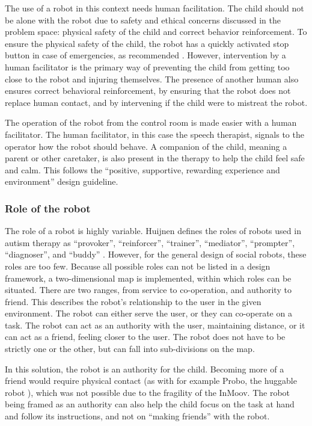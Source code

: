 The use of a robot in this context needs human facilitation. The child should not be alone with the robot due to safety and ethical concerns discussed in the problem space: physical safety of the child and correct behavior reinforcement. To ensure the physical safety of the child, the robot has a quickly activated stop button in case of emergencies, as recommended \cite{giullian2010detailed}. However, intervention by a human facilitator is the primary way of preventing the child from getting too close to the robot and injuring themselves. The presence of another human also ensures correct behavioral reinforcement, by ensuring that the robot does not replace human contact, and by intervening if the child were to mistreat the robot. 

The operation of the robot from the control room is made easier with a human facilitator. The human facilitator, in this case the speech therapist, signals to the operator how the robot should behave. A companion of the child, meaning a parent or other caretaker, is also present in the therapy to help the child feel safe and calm. This follows the ``positive, supportive, rewarding experience and environment'' design guideline.


\subsubsection{Role of the robot}

The role of a robot is highly variable. Huijnen defines the roles of robots used in autism therapy as ``provoker'', ``reinforcer'', ``trainer'', ``mediator'', ``prompter'', ``diagnoser'', and ``buddy'' \cite{huijnen2017implement}. However, for the general design of social robots, these roles are too few. Because all possible roles can not be listed in a design framework, a two-dimensional map is implemented, within which roles can be situated. There are two ranges, from service to co-operation, and authority to friend. This describes the robot's relationship to the user in the given environment. The robot can either serve the user, or they can co-operate on a task. The robot can act as an authority with the user, maintaining distance, or it can act as a friend, feeling closer to the user. The robot does not have to be strictly one or the other, but can fall into sub-divisions on the map.

In this solution, the robot is an authority for the child. Becoming more of a friend would require physical contact (as with for example Probo, the huggable robot \cite{ProboRef}), which was not possible due to the fragility of the InMoov. The robot being framed as an authority can also help the child focus on the task at hand and follow its instructions, and not on ``making friends'' with the robot. 

